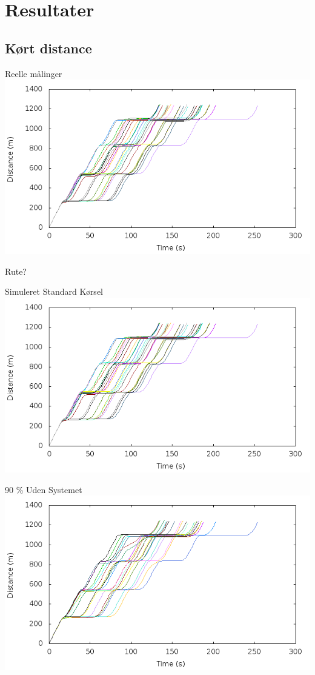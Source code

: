 \section{Resultater}
\subsection{Kørt distance}
\begin{frame}{Reelle målinger}
\includegraphics[width=1\textwidth]{images/distanceReal.png}

Rute?
\end{frame}

\begin{frame}{Simuleret Standard Kørsel}
\includegraphics[width=1\textwidth]{images/distanceUncontrolled0.png}
\end{frame}

\begin{frame}{90 \% Uden Systemet}
\includegraphics[width=1\textwidth]{images/distanceUncontrolled10.png}
\end{frame}

